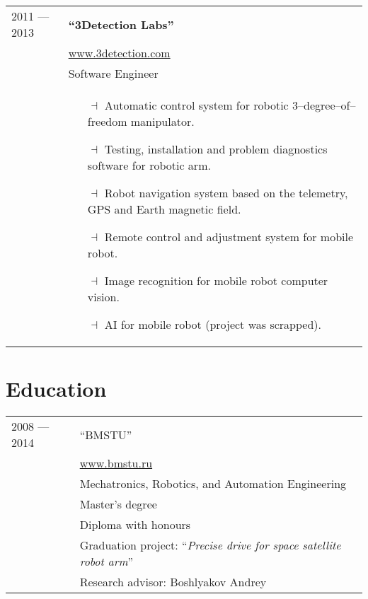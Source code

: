 \documentclass[a4paper, 10pt]{article}
\begin{document}
\begin{longtable}{p{20mm}|p{140mm}}
2011 --- 2013 & \textbf{``3Detection Labs''} \\
& \href{http://www.3detection.com/}{www.3detection.com} \\
& Software Engineer \\
& \begin{itemize}[topsep = 0pt, itemsep = 0pt]
    \item[$\dashv$] Automatic control system for robotic 3--degree--of--freedom manipulator.
    \item[$\dashv$] Testing, installation and problem diagnostics software for robotic arm.
    \item[$\dashv$] Robot navigation system based on the telemetry, GPS and Earth magnetic field.
    \item[$\dashv$] Remote control and adjustment system for mobile robot.
    \item[$\dashv$] Image recognition for mobile robot computer vision.
    \item[$\dashv$] AI for mobile robot (project was scrapped).
\end{itemize}
\\
\end{longtable}

\section{Education}
\begin{longtable}{p{20mm}|p{140mm}}
2008 --- 2014
& ``BMSTU'' \\
& \href{http://www.bmstu.ru}{www.bmstu.ru} \\
& Mechatronics, Robotics, and Automation Engineering \\
& Master's degree \\
& Diploma with honours \\
& Graduation project: ``\textit{Precise drive for space satellite robot arm}'' \\
& Research advisor: Boshlyakov Andrey \\
\end{longtable}

\end{document}
